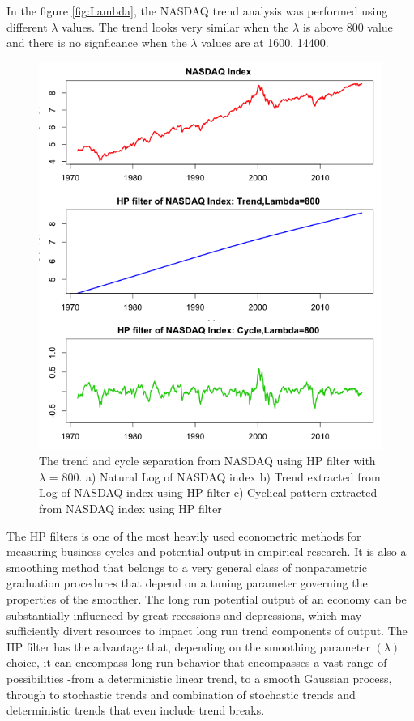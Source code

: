 In the figure \ref{fig:Lambda}, the NASDAQ trend analysis was performed using different $\lambda$ values. The trend looks very similar when the $\lambda$ is above 800 value and there is no signficance when the $\lambda$ values are at 1600, 14400.
\begin{figure}[!ht]
\centering
\includegraphics[scale=.65]{Images/NASDAQHP800}
\caption{The trend and cycle separation from NASDAQ using HP filter with $\lambda$ = 800. a) Natural Log of NASDAQ index b) Trend extracted from Log of NASDAQ index using HP filter c) Cyclical pattern extracted from NASDAQ index using HP filter }
\label{fig:NASDAQHP800}
\end{figure}

The HP filters is one of the most heavily used econometric methods for measuring business cycles and potential output in empirical research. It is also a smoothing method that belongs to a very general class of nonparametric graduation procedures that depend on a tuning parameter governing the properties of the smoother. The long run potential output of an economy can be substantially influenced by great recessions and depressions, which may sufficiently divert resources to impact long run trend components of output. The HP filter has the advantage that, depending on the smoothing parameter $(\lambda)$ choice, it can encompass long run behavior that encompasses a vast range of possibilities -from a deterministic linear trend, to a smooth Gaussian process, through to stochastic trends and combination of stochastic trends and deterministic trends that even include trend breaks. 

